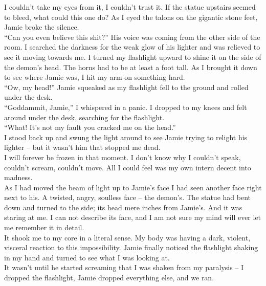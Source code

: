 \documentclass[a5paper]{scrartcl}
\begin{document}
I couldn't take my eyes from it, I couldn't trust it. If the statue upstairs seemed to bleed, what could this one do? As I eyed the talons on the gigantic stone feet, Jamie broke the silence.\\


\enquote{Can you even believe this shit?} His voice was coming from the other side of the room. I searched the darkness for the weak glow of his lighter and was relieved to see it moving towards me. I turned my flashlight upward to shine it on the side of the demon's head. The horns had to be at least a foot tall. As I brought it down to see where Jamie was, I hit my arm on something hard.\\


\enquote{Ow, my head!} Jamie squeaked as my flashlight fell to the ground and rolled under the desk.\\


\enquote{Goddammit, Jamie,} I whispered in a panic. I dropped to my knees and felt around under the desk, searching for the flashlight. \\


\enquote{What! It's not my fault you cracked me on the head.} \\


I stood back up and swung the light around to see Jamie trying to relight his lighter – but it wasn't him that stopped me dead. \\


I will forever be frozen in that moment. I don't know why I couldn't speak, couldn't scream, couldn't move. All I could feel was my own intern decent into madness.\\


As I had moved the beam of light up to Jamie's face I had seen another face right next to his. A twisted, angry, soulless face – the demon's. The statue had bent down and turned to the side; its head mere inches from Jamie's. And it was staring at me. I can not describe its face, and I am not sure my mind will ever let me remember it in detail. \\


It shook me to my core in a literal sense. My body was having a dark, violent, visceral reaction to this impossibility. Jamie finally noticed the flashlight shaking in my hand and turned to see what I was looking at. \\


It wasn't until he started screaming that I was shaken from my paralysis – I dropped the flashlight, Jamie dropped everything else, and we ran.\\
\end{document}
